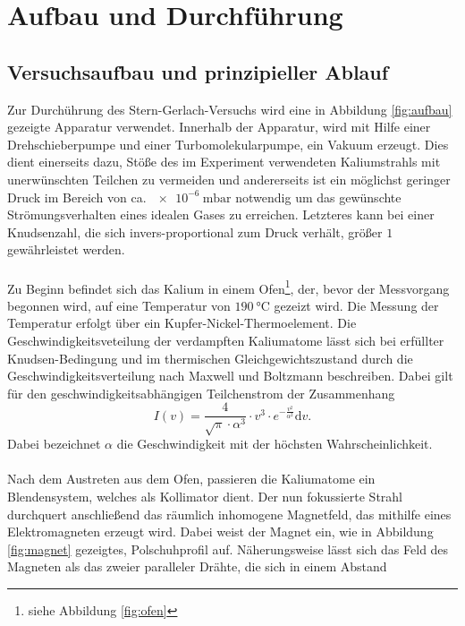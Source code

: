 \section{Aufbau und Durchführung}
\label{sec:Durchführung}

\subsection{Versuchsaufbau und prinzipieller Ablauf}
\label{subsec:d1}
Zur Durchührung des Stern-Gerlach-Versuchs wird eine in Abbildung
\ref{fig:aufbau} gezeigte Apparatur verwendet. Innerhalb der Apparatur, wird mit Hilfe
einer Drehschieberpumpe und einer Turbomolekularpumpe, ein Vakuum erzeugt. Dies dient
einerseits dazu, Stöße des im Experiment verwendeten Kaliumstrahls mit unerwünschten
Teilchen zu vermeiden und andererseits ist ein möglichst geringer Druck im Bereich von ca.
$\SI{e-6}{\milli\bar}$ notwendig um das gewünschte Strömungsverhalten eines idealen Gases zu erreichen.
Letzteres kann bei einer Knudsenzahl, die sich invers-proportional zum Druck verhält, größer $1$
gewährleistet werden.\\ \\
Zu Beginn befindet sich das Kalium in einem Ofen\footnote{siehe Abbildung \ref{fig:ofen}}, der, bevor der
Messvorgang begonnen wird, auf eine Temperatur von $\SI{190}{\degreeCelsius}$
gezeizt wird. Die Messung der Temperatur erfolgt über ein Kupfer-Nickel-Thermoelement.
Die Geschwindigkeitsveteilung der verdampften Kaliumatome lässt sich bei erfüllter Knudsen-Bedingung
und im thermischen Gleichgewichtszustand durch die Geschwindigkeitsverteilung nach
Maxwell und Boltzmann beschreiben. Dabei gilt für den geschwindigkeitsabhängigen Teilchenstrom
der Zusammenhang
\begin{equation}
  \label{eqn:maxwell}
  I(v) = \frac{4}{\sqrt{\pi} \cdot \alpha^3} \cdot v^3 \cdot e^{-\frac{v^2}{\alpha^2}} \mathrm{d}v .
\end{equation}
Dabei bezeichnet $\alpha$ die Geschwindigkeit mit der höchsten Wahrscheinlichkeit. \\ \\
Nach dem Austreten aus dem Ofen, passieren die Kaliumatome ein Blendensystem, welches als Kollimator dient.
Der nun fokussierte Strahl durchquert anschließend das räumlich inhomogene Magnetfeld,
das mithilfe eines Elektromagneten erzeugt wird. Dabei weist der Magnet ein,
wie in Abbildung \ref{fig:magnet} gezeigtes, Polschuhprofil auf.
Näherungsweise lässt sich das Feld des Magneten als das zweier paralleler Drähte, die sich in einem Abstand
